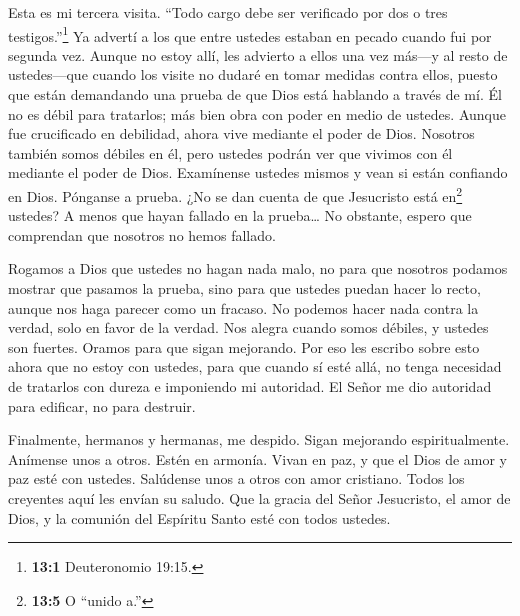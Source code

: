  Esta es mi tercera visita. ``Todo cargo debe ser verificado
por dos o tres testigos.''\footnote{\textbf{13:1} Deuteronomio 19:15.}
 Ya advertí a los que entre ustedes estaban en pecado cuando
fui por segunda vez. Aunque no estoy allí, les advierto a ellos una vez
más---y al resto de ustedes---que cuando los visite no dudaré en tomar
medidas contra ellos,  puesto que están demandando una
prueba de que Dios está hablando a través de mí. Él no es débil para
tratarlos; más bien obra con poder en medio de ustedes. 
Aunque fue crucificado en debilidad, ahora vive mediante el poder de
Dios. Nosotros también somos débiles en él, pero ustedes podrán ver que
vivimos con él mediante el poder de Dios.  Examínense
ustedes mismos y vean si están confiando en Dios. Pónganse a prueba. ¿No
se dan cuenta de que Jesucristo está en\footnote{\textbf{13:5} O ``unido
  a.''} ustedes? A menos que hayan fallado en la prueba\ldots{}
 No obstante, espero que comprendan que nosotros no hemos
fallado.

 Rogamos a Dios que ustedes no hagan nada malo, no para que
nosotros podamos mostrar que pasamos la prueba, sino para que ustedes
puedan hacer lo recto, aunque nos haga parecer como un fracaso.
 No podemos hacer nada contra la verdad, solo en favor de la
verdad.  Nos alegra cuando somos débiles, y ustedes son
fuertes. Oramos para que sigan mejorando.  Por eso les
escribo sobre esto ahora que no estoy con ustedes, para que cuando sí
esté allá, no tenga necesidad de tratarlos con dureza e imponiendo mi
autoridad. El Señor me dio autoridad para edificar, no para destruir.

 Finalmente, hermanos y hermanas, me despido. Sigan
mejorando espiritualmente. Anímense unos a otros. Estén en armonía.
Vivan en paz, y que el Dios de amor y paz esté con ustedes.
 Salúdense unos a otros con amor cristiano. 
Todos los creyentes aquí les envían su saludo.  Que la
gracia del Señor Jesucristo, el amor de Dios, y la comunión del Espíritu
Santo esté con todos ustedes.
